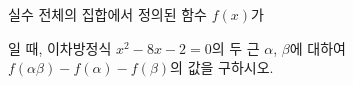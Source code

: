 실수 전체의 집합에서 정의된 함수 $f(x)$가\par\smallskip{}\par\smallskip\noindent 일 때, 이차방정식 $x^2-8x-2=0$의 두 근 $\alpha$, $\beta$에 대하여 $f(\alpha\beta)-f(\alpha)-f(\beta)$의 값을 구하시오.

